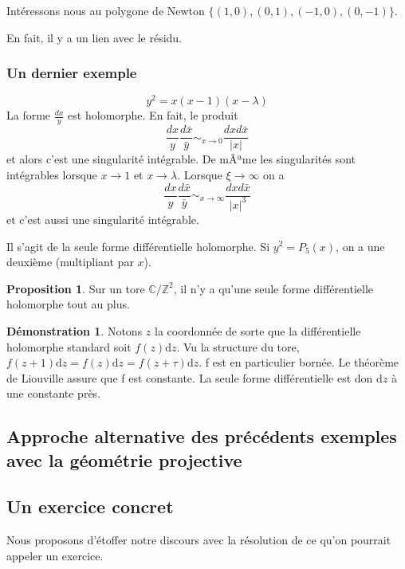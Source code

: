 \documentclass{article}
\newcommand{\C}{\mathbb{C}} %
\newcommand{\Z}{\mathbb{Z}} %
\theoremstyle{definition} %
\newtheorem{prop}{Proposition}
\newtheorem{dem}{Démonstration}
\newcommand{\dd}{ \mathrm{d}}
\newcommand{\1}{\mathbb{1}} %
\begin{document}
Intéressons nous au polygone de Newton $\{(1,0),(0,1),(-1,0),(0,-1)\}$.

En fait, il y a un lien avec le résidu.

\subsubsection{Un dernier exemple}

$$y^2=x(x-1)(x-
\lambda)$$
La forme $\displaystyle \frac{dx}{y}$ est holomorphe. En fait, le produit $$\frac{dx}{y} \frac{d\bar{x}}{\bar{y}}\mathop{\sim}_{x\to 0}\frac{dxd\bar{x}}{|x|}$$
et alors c'est une singularité intégrable. De mÃªme les singularités sont intégrables lorsque $x\to 1$ et $x\to \lambda$. Lorsque $\xi\to \infty$ on a
$$\frac{dx}{y} \frac{d\bar{x}}{\bar{y}}\mathop{\sim}_{x\to \infty}\frac{dxd\bar{x}}{|x|^3}$$
et c'est aussi une singularité intégrable.

Il s'agit de la seule forme différentielle holomorphe.
Si $y^2=P_5(x)$, on a une deuxième (multipliant par $x$).


\begin{prop}
    Sur un tore $\C / \Z^2$, il n'y a qu'une seule forme différentielle holomorphe tout au plus.
\end{prop}

\begin{dem}
    Notons $z$ la coordonnée de sorte que la différentielle holomorphe standard soit $f(z) \dd z$.
    Vu la structure du tore,
    $f(z+1) \dd z=f(z) \dd z=f(z+ \tau) \dd z$.
    f est en particulier bornée.
    Le théorème de Liouville assure que f est constante.
    La seule forme différentielle est don $\dd z$ à une constante près.

\end{dem}

\subsection{Approche alternative des précédents exemples avec la géométrie projective}

\subsection{Un exercice concret}

Nous proposons d'étoffer notre discours avec la résolution de ce qu'on pourrait appeler un exercice.
\end{document}

